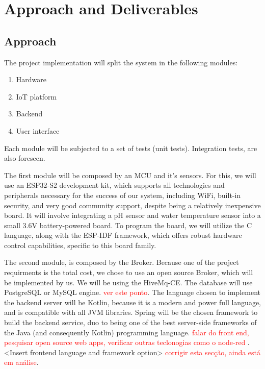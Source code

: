 \documentclass[a4paper,twoside,11pt]{article}
\begin{document}
\section{Approach and Deliverables}
\subsection{Approach}
The project implementation will split the system in the following modules:
\begin{enumerate}
    \item Hardware
    \item IoT platform
    \item Backend 
    \item User interface
\end{enumerate}
Each module will be subjected to a set of tests (unit tests). Integration tests, are also foreseen.

The first module will be composed by an MCU and it's sensors. For this, we will use an ESP32-S2 development kit, which supports all technologies and peripherals necessary for the success of our system, including WiFi, built-in security, and very good community support, despite being a relatively inexpensive board. It will involve integrating a pH sensor and water temperature sensor into a small 3.6V battery-powered board. To program the board, we will utilize the C language, along with the ESP-IDF framework, which offers robust hardware control capabilities, specific to this board family.

The second module, is composed by the Broker. Because one of the project requirments is the total cost, we chose to use an open source Broker, which will be implemented by us. We will be using the HiveMq-CE.
The database will use PostgreSQL or MySQL engine.
 \textcolor{red}{ver este ponto}.
The language chosen to implement the backend server will be Kotlin, because it is a modern and power full language, and is compatible with all JVM libraries.
Spring will be the chosen framework to build the backend service, duo to being one of the best server-side frameworks of the Java (and consequently Kotlin) programming language.
 \textcolor{red}{falar do front end, pesquisar open source web apps, verificar outras teclonogias como o node-red }.
<Insert frontend language and framework option>
 \textcolor{red}{corrigir esta secção, ainda está em análise}.
\end{document}

